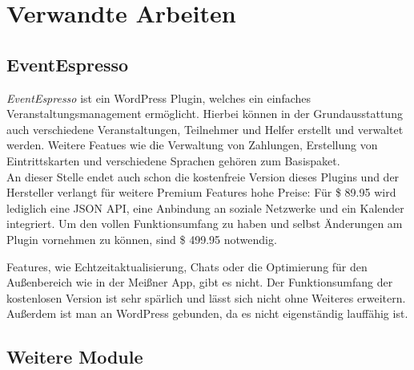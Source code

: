 \chapter{Verwandte Arbeiten}

\section{EventEspresso}
\emph{EventEspresso} \cite{eventespresso} ist ein WordPress Plugin, welches ein einfaches Veranstaltungsmanagement ermöglicht. Hierbei können in der Grundausstattung auch verschiedene Veranstaltungen, Teilnehmer und Helfer erstellt und verwaltet werden. Weitere Featues wie die Verwaltung von Zahlungen, Erstellung von Eintrittskarten und verschiedene Sprachen gehören zum Basispaket.\\
An dieser Stelle endet auch schon die kostenfreie Version dieses Plugins und der Hersteller verlangt für weitere Premium Features hohe Preise: Für \$ 89.95 wird lediglich eine JSON API, eine Anbindung an soziale Netzwerke und ein Kalender integriert. Um den vollen Funktionsumfang zu haben und selbst Änderungen am Plugin vornehmen zu können, sind \$ 499.95 notwendig.\par

Features, wie Echtzeitaktualisierung, Chats oder die Optimierung für den Außenbereich wie in der Meißner App, gibt es nicht. Der Funktionsumfang der kostenlosen Version ist sehr spärlich und lässt sich nicht ohne Weiteres erweitern. Außerdem ist man an WordPress gebunden, da es nicht eigenständig lauffähig ist.

\section{Weitere Module}
